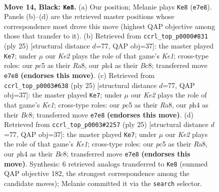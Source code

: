 \documentclass[11pt]{article}
\begin{document}
\clearpage

\begin{figure}[p]\centering
\begin{subfigure}{0.46\textwidth}\centering
\resizebox{\linewidth}{!}{%
\newchessgame
\chessboard[
  setfen={r1b2b1r/4kppp/2p1pn2/p1P3N1/5P1P/4P3/PP6/RNBR2K1 b - - 0 14},
  showmover=false,
  pgfstyle=straightmove, color=movearrow, markmove={e7-e8}
]}
\caption{}
\end{subfigure}\hfill
\begin{subfigure}{0.46\textwidth}\centering
\resizebox{\linewidth}{!}{%
\newchessgame
\chessboard[
  setfen={r1b1k2r/pp1n1ppp/4p3/3pP3/3N1P2/8/PPP3PP/R3KB1R b KQkq - 0 13},
  showmover=false,
  pgfstyle=straightmove, color=movearrow, markmove={e8-e7}
]}
\caption{}
\end{subfigure}
\\[4pt]
\begin{subfigure}{0.46\textwidth}\centering
\resizebox{\linewidth}{!}{%
\newchessgame
\chessboard[
  setfen={r1b1k2r/pp1n1ppp/4p3/3pP3/3N1P2/8/PPP3PP/R3KB1R b KQkq - 0 13},
  showmover=false,
  pgfstyle=straightmove, color=movearrow, markmove={e8-e7}
]}
\caption{}
\end{subfigure}\hfill
\begin{subfigure}{0.46\textwidth}\centering
\resizebox{\linewidth}{!}{%
\newchessgame
\chessboard[
  setfen={r1b1k2r/pp1n1ppp/4p3/3pP3/3N1P2/8/PPP3PP/R3KB1R b KQkq - 0 13},
  showmover=false,
  pgfstyle=straightmove, color=movearrow, markmove={e8-e7}
]}
\caption{}
\end{subfigure}
\caption{\textbf{Move 14, Black: \texttt{Ke8}.} (a) Our position; Melanie plays \texttt{Ke8} (\texttt{e7e8}). Panels (b)--(d) are the retrieved master positions whose correspondence most drove this move (highest QAP objective among those that transfer to it). (b) Retrieved from \texttt{ccrl\_top\_p0000\#831} (ply 25) [structural distance $d$=77, QAP obj=37]: the master played \texttt{Ke7}; under $\mu$ our \emph{Ke2} plays the role of that game's \emph{Ke1}; cross-type roles: our \emph{p}c5 as their \emph{R}a8, our \emph{p}h4 as their \emph{B}c8; transferred move \texttt{e7e8} \textbf{(endorses this move)}. (c) Retrieved from \texttt{ccrl\_top\_p0003\#638} (ply 25) [structural distance $d$=77, QAP obj=37]: the master played \texttt{Ke7}; under $\mu$ our \emph{Ke2} plays the role of that game's \emph{Ke1}; cross-type roles: our \emph{p}c5 as their \emph{R}a8, our \emph{p}h4 as their \emph{B}c8; transferred move \texttt{e7e8} \textbf{(endorses this move)}. (d) Retrieved from \texttt{ccrl\_top\_p0003\#2257} (ply 25) [structural distance $d$=77, QAP obj=37]: the master played \texttt{Ke7}; under $\mu$ our \emph{Ke2} plays the role of that game's \emph{Ke1}; cross-type roles: our \emph{p}c5 as their \emph{R}a8, our \emph{p}h4 as their \emph{B}c8; transferred move \texttt{e7e8} \textbf{(endorses this move)}. Synthesis: 6 retrieved analogs transferred to \texttt{Ke8} (summed QAP objective 182, the strongest correspondence among the candidate moves); Melanie committed it via the \texttt{search} selector.}
\label{fig:thought-m27}
\end{figure}
\end{document}
